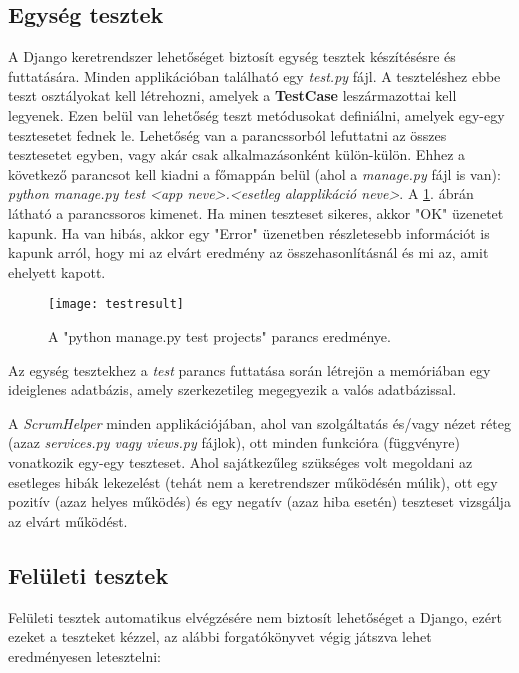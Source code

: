 \subsection{Egység tesztek}

A Django keretrendszer lehetőséget biztosít egység tesztek készítésésre és futtatására. Minden applikációban található egy \textit{test.py} fájl. A teszteléshez ebbe teszt osztályokat kell létrehozni, amelyek a \textbf{TestCase} leszármazottai kell legyenek. Ezen belül van lehetőség teszt metódusokat definiálni, amelyek egy-egy tesztesetet fednek le. Lehetőség van a parancssorból lefuttatni az összes tesztesetet egyben, vagy akár csak alkalmazásonként külön-külön. Ehhez a következő parancsot kell kiadni a főmappán belül (ahol a \textit{manage.py} fájl is van): \textit{python manage.py test <app neve>.<esetleg alapplikáció neve>}. A \ref{fig:tests}. ábrán látható a parancssoros kimenet. Ha minen teszteset sikeres, akkor "OK" üzenetet kapunk. Ha van hibás, akkor egy "Error" üzenetben részletesebb információt is kapunk arról, hogy mi az elvárt eredmény az összehasonlításnál és mi az, amit ehelyett kapott.

\begin{figure}[H]
	\centering
	\texttt{[image: testresult]}
	\caption{A "python manage.py test projects" parancs eredménye.}
	\label{fig:tests}
\end{figure}

Az egység tesztekhez a \textit{test} parancs futtatása során létrejön a memóriában egy ideiglenes adatbázis, amely szerkezetileg megegyezik a valós adatbázissal. 

A \textit{ScrumHelper} minden applikációjában, ahol van szolgáltatás és/vagy nézet réteg (azaz \textit{services.py vagy views.py} fájlok), ott minden funkcióra (függvényre) vonatkozik egy-egy teszteset. Ahol sajátkezűleg szükséges volt megoldani az esetleges hibák lekezelést (tehát nem a keretrendszer működésén múlik), ott egy pozitív (azaz helyes működés) és egy negatív (azaz hiba esetén) teszteset vizsgálja az elvárt működést.

\subsection{Felületi tesztek}

Felületi tesztek automatikus elvégzésére nem biztosít lehetőséget a Django, ezért ezeket a teszteket kézzel, az alábbi forgatókönyvet végig játszva lehet eredményesen letesztelni:

